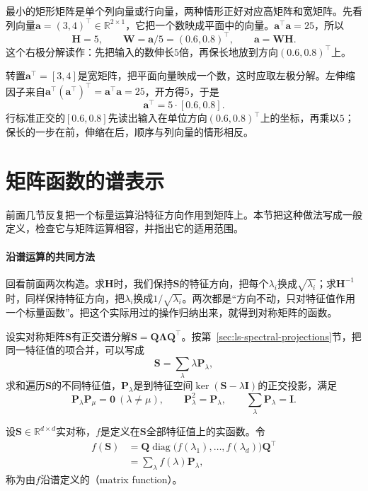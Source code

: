 \begin{example}[行向量与列向量的极分解]
\label{ex:polar-rectangular}
最小的矩形矩阵是单个列向量或行向量，两种情形正好对应高矩阵和宽矩阵。先看列向量$\bm a=(3,4)^\top\in\mathbb R^{2\times1}$，它把一个数映成平面中的向量。$\bm a^\top\bm a=25$，所以
\[
 \bm H=5,\qquad\bm W=\bm a/5=(0.6,0.8)^\top,\qquad\bm a=\bm W\bm H .
\]
这个右极分解读作：先把输入的数伸长$5$倍，再保长地放到方向$(0.6,0.8)^\top$上。

转置$\bm a^\top=[3,4]$是宽矩阵，把平面向量映成一个数，这时应取左极分解。左伸缩因子来自$\bm a^\top(\bm a^\top)^\top=\bm a^\top\bm a=25$，开方得$5$，于是
\[
 \bm a^\top=5\cdot[0.6,0.8].
\]
行标准正交的$[0.6,0.8]$先读出输入在单位方向$(0.6,0.8)^\top$上的坐标，再乘以$5$；保长的一步在前，伸缩在后，顺序与列向量的情形相反。
\end{example}

\section{矩阵函数的谱表示}
\label{sec:ls-matrix-functions}
\label{sec:matrix-analysis-functions-structured-operations}

前面几节反复把一个标量运算沿特征方向作用到矩阵上。本节把这种做法写成一般定义，检查它与矩阵运算相容，并指出它的适用范围。

\paragraph{沿谱运算的共同方法}

回看前面两次构造。求$\bm H$时，我们保持$\bm S$的特征方向，把每个$\lambda_i$换成$\sqrt{\lambda_i}$；求$\bm H^{-1}$时，同样保持特征方向，把$\lambda_i$换成$1/\sqrt{\lambda_i}$。两次都是“方向不动，只对特征值作用一个标量函数”。把这个实际用过的操作归纳出来，就得到对称矩阵的函数。

设实对称矩阵$\bm S$有正交谱分解$\bm S=\bm Q\bm\Lambda\bm Q^\top$。按第~\ref{sec:ls-spectral-projections}节，把同一特征值的项合并，可以写成
\[
 \bm S=\sum_\lambda\lambda\bm P_\lambda ,
\]
求和遍历$\bm S$的不同特征值，$\bm P_\lambda$是到特征空间$\ker(\bm S-\lambda\bm I)$的正交投影，满足
\[
 \bm P_\lambda\bm P_\mu=\bm0\ (\lambda\neq\mu),\qquad\bm P_\lambda^2=\bm P_\lambda,\qquad\sum_\lambda\bm P_\lambda=\bm I .
\]

\begin{definition}[对称矩阵的谱函数]
\label{def:ls-symmetric-matrix-function}
设$\bm S\in\mathbb R^{d\times d}$实对称，$f$是定义在$\bm S$全部特征值上的实函数。令
\begin{equation}
\begin{aligned}
 f(\bm S)
 &=\bm Q\operatorname{diag}\bigl(f(\lambda_1),\ldots,f(\lambda_d)\bigr)\bm Q^\top\\
 &=\sum_\lambda f(\lambda)\bm P_\lambda ,
\end{aligned}
\label{eq:ls-symmetric-spectral-function}
\end{equation}
称为由$f$沿谱定义的（matrix function）。
\end{definition}

